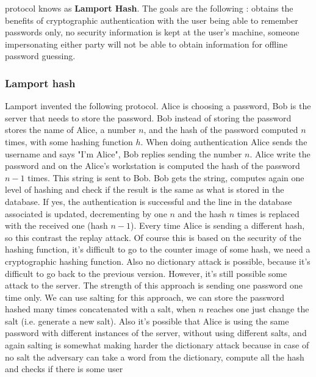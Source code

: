 \documentclass[11pt]{article}
\begin{document}
protocol knows as \textbf{Lamport Hash}. The goals are the following : obtains the benefits of cryptographic authentication with the user being able to remember passwords only, no security information is kept at the user's machine, someone impersonating either party will not be able to obtain information for offline password guessing.
\subsubsection{Lamport hash}
Lamport invented the following protocol. Alice is choosing a password, Bob is the server that needs to store the password. Bob instead of storing the password stores the name of Alice, a number $n$, and the hash of the password computed $n$ times, with some hashing function $h$. When doing authentication Alice sends the username and says "I'm Alice", Bob replies sending the number $n$. Alice write the password and on the Alice’s workstation is computed the hash of the password $n - 1$ times. This string is sent to Bob. Bob gets the string, computes again one level of hashing and check if the result is the same as what is stored in the database. If yes, the authentication is successful and the line in the database associated is updated, decrementing by one $n$ and the hash $n$ times is replaced with the received one (hash $n - 1$). Every time Alice is sending a different hash, so this contrast the replay attack. Of course this is based on the security of the hashing function, it's difficult to go to the counter image of some hash, we need a cryptographic hashing function. Also no dictionary attack is possible, because it's difficult to go back to the previous version. However, it's still possible some attack to the server. The strength of this approach is sending one password one time only. We can use salting for this approach, we can store the password hashed many times concatenated with a salt, when $n$ reaches one just change the salt (i.e. generate a new salt). Also it's possible that Alice is using the same password with different instances of the server, without using different salts, and again salting is somewhat making harder the dictionary attack because in case of no salt the adversary can take a word from the dictionary, compute all the hash and checks if there is some user
\end{document}
